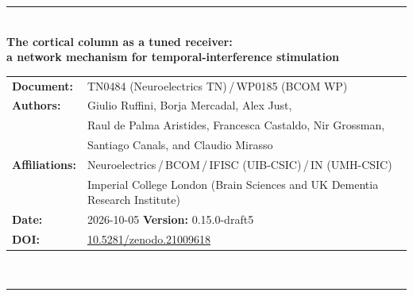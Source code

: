 \documentclass[11pt,a4paper]{article}
\newif\ifsupp
\newcommand{\paperver}{0.15.0-draft5} %
\begin{document}
\vspace{6pt}
\else
\begin{flushleft}
{\color{neblue}\rule{\textwidth}{2pt}}\\[4pt]
{\LARGE\bfseries The cortical column as a tuned receiver:\\[2pt]
a network mechanism for temporal-interference stimulation}\\[10pt]
\begin{tabular}{@{}ll@{}}
\textbf{Document:} & TN0484 (Neuroelectrics TN)\,/\,WP0185 (BCOM WP) \\
\textbf{Authors:} & Giulio Ruffini, Borja Mercadal, Alex Just,\\
& Raul de Palma Aristides, Francesca Castaldo, Nir Grossman,\\
& Santiago Canals, and Claudio Mirasso \\
\textbf{Affiliations:} & Neuroelectrics\,/\,BCOM\,/\,IFISC (UIB-CSIC)\,/\,IN (UMH-CSIC)\\
& Imperial College London (Brain Sciences and UK Dementia Research Institute) \\
\textbf{Date:} & 2026-10-05 \qquad \textbf{Version:} \paperver \\
\textbf{DOI:} & \href{https://doi.org/10.5281/zenodo.21009618}{10.5281/zenodo.21009618} \\
\end{tabular}\\[4pt]
{\color{neblue}\rule{\textwidth}{1pt}}
\end{flushleft}
\fi

\ifsupp
\begin{center}
{\large\bfseries Supplementary Material}\\[4pt]
\begin{minipage}{0.86\textwidth}\centering\small
Appendices and supplementary figures accompanying the article. Section, equation and
figure numbers referenced here follow the main text; supplementary figures are numbered
S1, S2, \dots
\end{minipage}
\end{center}
\vspace{8pt}
\fi

\ifsupp\else
\end{document}
